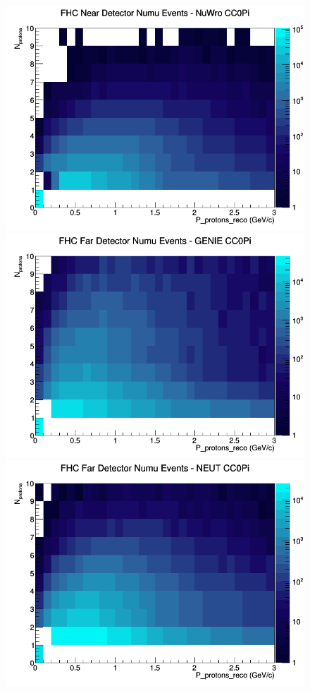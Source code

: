 \documentclass[12pt]{article}
\begin{document}
\begin{figure}[h]
\includegraphics[width=\linewidth]{eff_N_P/FGT/protons/CC0Pi_FHC_ND_numu_N_P_NuWro.png}
\endminipage
\newline
{}
\includegraphics[width=\linewidth]{eff_N_P/FGT/protons/CC0Pi_FHC_FD_numu_N_P_GENIE.png}
\endminipage
{}
\includegraphics[width=\linewidth]{eff_N_P/FGT/protons/CC0Pi_FHC_FD_numu_N_P_NEUT.png}

\end{figure}
\end{document}
